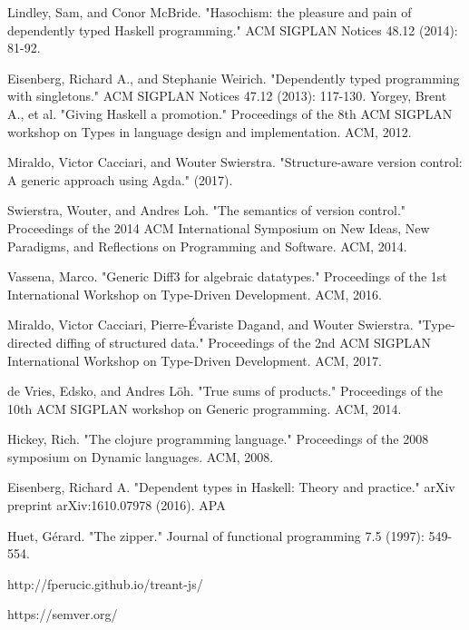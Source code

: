 \documentclass[11pt, titlepage]{article}
\begin{document}
\begin{thebibliography}{20}  
  Lindley, Sam, and Conor McBride. "Hasochism: the pleasure and pain of dependently typed Haskell programming." ACM SIGPLAN Notices 48.12 (2014): 81-92.

  Eisenberg, Richard A., and Stephanie Weirich. "Dependently typed programming with singletons." ACM SIGPLAN Notices 47.12 (2013): 117-130.
  Yorgey, Brent A., et al. "Giving Haskell a promotion." Proceedings of the 8th ACM SIGPLAN workshop on Types in language design and implementation. ACM, 2012.
  
   Miraldo, Victor Cacciari, and Wouter Swierstra. "Structure-aware version control: A generic approach using Agda." (2017).

   Swierstra, Wouter, and Andres Loh. "The semantics of version control." Proceedings of the 2014 ACM International Symposium on New Ideas, New Paradigms, and Reflections on Programming and Software. ACM, 2014.
  
  Vassena, Marco. "Generic Diff3 for algebraic datatypes." Proceedings of the 1st International Workshop on Type-Driven Development. ACM, 2016.

  Miraldo, Victor Cacciari, Pierre-Évariste Dagand, and Wouter Swierstra. "Type-directed diffing of structured data." Proceedings of the 2nd ACM SIGPLAN International Workshop on Type-Driven Development. ACM, 2017.
  
  de Vries, Edsko, and Andres Löh. "True sums of products." Proceedings of the 10th ACM SIGPLAN workshop on Generic programming. ACM, 2014.
  
Hickey, Rich. "The clojure programming language." Proceedings of the 2008 symposium on Dynamic languages. ACM, 2008.

 Eisenberg, Richard A. "Dependent types in Haskell: Theory and practice." arXiv preprint arXiv:1610.07978 (2016). APA	

 Huet, Gérard. "The zipper." Journal of functional programming 7.5 (1997): 549-554.

 http://fperucic.github.io/treant-js/

 https://semver.org/

\end{thebibliography}
\end{document}
